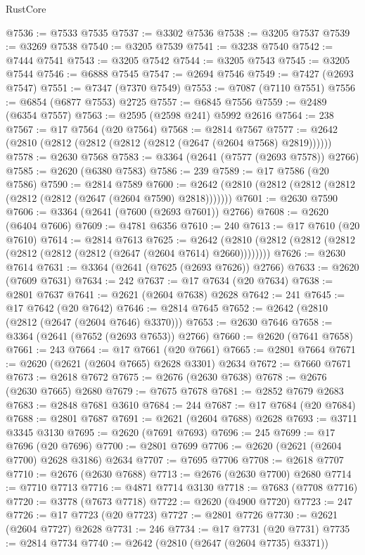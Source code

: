 \begin{lexlean}{RustCore}
\begin{coremodule}
@7536 := @7533 @7535
@7537 := @3302 @7536
@7538 := @3205 @7537
@7539 := @3269 @7538
@7540 := @3205 @7539
@7541 := @3238 @7540
@7542 := @7444 @7541
@7543 := @3205 @7542
@7544 := @3205 @7543
@7545 := @3205 @7544
@7546 := @6888 @7545
@7547 := @2694 @7546
@7549 := @7427 (@2693 @7547)
@7551 := @7347 (@7370 @7549)
@7553 := @7087 (@7110 @7551)
@7556 := @6854 (@6877 @7553) @2725
@7557 := @6845 @7556
@7559 := @2489 (@6354 @7557)
@7563 := @2595 (@2598 @241) @5992 @2616
@7564 := 238
@7567 := @17 @7564 (@20 @7564)
@7568 := @2814 @7567
@7577 := @2642 (@2810 (@2812 (@2812 (@2812 (@2812 (@2647 (@2604 @7568) @2819))))))
@7578 := @2630 @7568
@7583 := @3364 (@2641 (@7577 (@2693 @7578)) @2766)
@7585 := @2620 (@6380 @7583)
@7586 := 239
@7589 := @17 @7586 (@20 @7586)
@7590 := @2814 @7589
@7600 := @2642 (@2810 (@2812 (@2812 (@2812 (@2812 (@2812 (@2647 (@2604 @7590) @2818)))))))
@7601 := @2630 @7590
@7606 := @3364 (@2641 (@7600 (@2693 @7601)) @2766)
@7608 := @2620 (@6404 @7606)
@7609 := @4781 @6356
@7610 := 240
@7613 := @17 @7610 (@20 @7610)
@7614 := @2814 @7613
@7625 := @2642 (@2810 (@2812 (@2812 (@2812 (@2812 (@2812 (@2812 (@2647 (@2604 @7614) @2660))))))))
@7626 := @2630 @7614
@7631 := @3364 (@2641 (@7625 (@2693 @7626)) @2766)
@7633 := @2620 (@7609 @7631)
@7634 := 242
@7637 := @17 @7634 (@20 @7634)
@7638 := @2801 @7637
@7641 := @2621 (@2604 @7638) @2628
@7642 := 241
@7645 := @17 @7642 (@20 @7642)
@7646 := @2814 @7645
@7652 := @2642 (@2810 (@2812 (@2647 (@2604 @7646) @3370)))
@7653 := @2630 @7646
@7658 := @3364 (@2641 (@7652 (@2693 @7653)) @2766)
@7660 := @2620 (@7641 @7658)
@7661 := 243
@7664 := @17 @7661 (@20 @7661)
@7665 := @2801 @7664
@7671 := @2620 (@2621 (@2604 @7665) @2628 @3301) @2634
@7672 := @7660 @7671
@7673 := @2618 @7672
@7675 := @2676 (@2630 @7638)
@7678 := @2676 (@2630 @7665) @2680
@7679 := @7675 @7678
@7681 := @2852 @7679 @2683
@7683 := @2848 @7681 @3610
@7684 := 244
@7687 := @17 @7684 (@20 @7684)
@7688 := @2801 @7687
@7691 := @2621 (@2604 @7688) @2628
@7693 := @3711 @3345 @3130
@7695 := @2620 (@7691 @7693)
@7696 := 245
@7699 := @17 @7696 (@20 @7696)
@7700 := @2801 @7699
@7706 := @2620 (@2621 (@2604 @7700) @2628 @3186) @2634
@7707 := @7695 @7706
@7708 := @2618 @7707
@7710 := @2676 (@2630 @7688)
@7713 := @2676 (@2630 @7700) @2680
@7714 := @7710 @7713
@7716 := @4871 @7714 @3130
@7718 := @7683 (@7708 @7716)
@7720 := @3778 (@7673 @7718)
@7722 := @2620 (@4900 @7720)
@7723 := 247
@7726 := @17 @7723 (@20 @7723)
@7727 := @2801 @7726
@7730 := @2621 (@2604 @7727) @2628
@7731 := 246
@7734 := @17 @7731 (@20 @7731)
@7735 := @2814 @7734
@7740 := @2642 (@2810 (@2647 (@2604 @7735) @3371))

\end{coremodule}
\end{lexlean}
